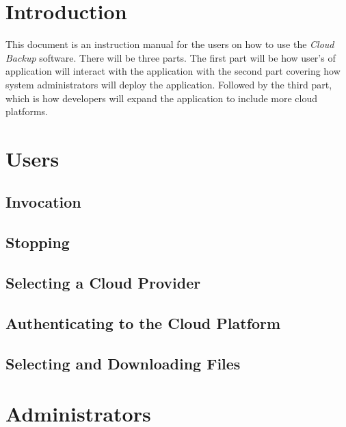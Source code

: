 \documentclass{article}
\begin{document}
    


    \tableofcontents
    \newpage
    \listoffigures


    \newpage
    \begin{versionhistory}
    \end{versionhistory}
    \newpage


    \section{Introduction}
        This document is an instruction manual for the users on how to use the \textit{Cloud Backup} software. There will be three parts.
        The first part will be how user's of application will interact with the application with the second part covering how system
        administrators will deploy the application. Followed by the third part, which is how developers will expand the application to
        include more cloud platforms.

    \section{Users}
      \subsection{Invocation}

      \subsection{Stopping}

      \subsection{Selecting a Cloud Provider}

      \subsection{Authenticating to the Cloud Platform}

      \subsection{Selecting and Downloading Files}

    \section{Administrators}
\end{document}
